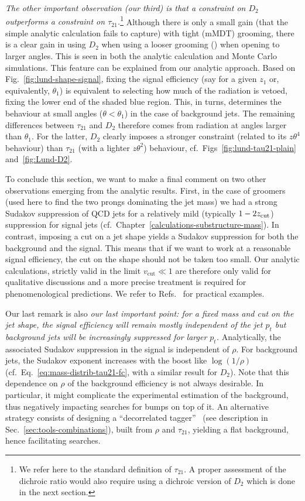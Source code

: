 {\em The other important observation (our third) is that a constraint
  on $D_2$ outperforms a constraint on $\tau_{21}$.}\footnote{We refer
  here to the standard definition of $\tau_{21}$. A proper assessment
  of the dichroic ratio would also require using a dichroic version of
  $D_2$ which is done in the next section.}
%
Although there is only a small gain (that the simple analytic
calculation fails to capture) with tight (mMDT) grooming, there is a
clear gain in using $D_2$ when using a looser grooming (\SD) \ie when
opening to larger angles. This is seen in both the analytic
calculation and Monte Carlo simulations.
%
This feature can be explained from our analytic approach.
Based on Fig.~\ref{fig:lund-shape-signal}, fixing the signal
efficiency (say for a given $z_1$ or, equivalently, $\theta_1$) is
equivalent to selecting how much of the radiation is vetoed, \ie fixing
the lower end of the shaded blue region. This, in turns, determines 
the behaviour at small angles ($\theta<\theta_1$) in the case of
background jets. The remaining differences between $\tau_{21}$ and
$D_2$ therefore comes from radiation at angles larger than
$\theta_1$. For the latter, $D_2$ clearly imposes a stronger
constraint (related to its $z\theta^4$ behaviour) than $\tau_{21}$
(with a lighter $z\theta^2$) behaviour,
cf.~Figs~\ref{fig:lund-tau21-plain} and~\ref{fig:Lund-D2}.

To conclude this section, we want to make a final comment on two other
observations emerging from the analytic results.
%
First, in the case of groomers (used here to find the two prongs
dominating the jet mass) we had a strong Sudakov suppression of QCD
jets for a relatively mild (typically $1-2z_{\text{cut}}$) suppression for
signal jets (cf.~Chapter~\ref{calculations-substructure-mass}). In
contrast, imposing a cut on a jet shape yields a Sudakov suppression
for both the background and the signal. This means that if we want to
work at a reasonable signal efficiency, the cut on the shape should
not be taken too small. Our analytic calculations, strictly valid in
the limit $v_\text{cut}\ll 1$ are therefore only valid for
qualitative discussions and a more precise treatment is required for
phenomenological predictions. We refer to
Refs.~\cite{Larkoski:2015kga,Napoletano:2018ohv} for practical
examples.

Our last remark is also {\em our last important point: for a fixed
  mass and cut on the jet shape, the signal efficiency will remain
  mostly independent of the jet $p_t$ but background jets will be
  increasingly suppressed for larger $p_t$.} Analytically, the
associated Sudakov suppression in the signal is independent of
$\rho$. For background jets, the Sudakov exponent increases with the
boost like $\log(1/\rho)$ (cf.~Eq.~\eqref{eq:mass-distrib-tau21-fc},
with a similar result for $D_2$).
%
Note that this dependence on $\rho$ of the background efficiency is
not always desirable. In particular, it might complicate the
experimental estimation of the background, thus negatively impacting searches for
bumps on top of it.
%
An alternative strategy consists of designing a ``decorrelated
tagger''~\cite{Dolen:2016kst} (see description in Sec.~\ref{sec:tools-combinations}), \eg built from $\rho$ and $\tau_{21}$,
yielding a flat background, hence facilitating searches.


